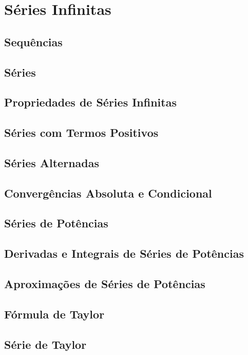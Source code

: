 \chapter{Séries Infinitas}
\label{chp:series}

\section{Sequências}
\label{sec:sequences}

\section{Séries}
\label{sec:series}

\section{Propriedades de Séries Infinitas}
\label{sec:propseries}

\section{Séries com Termos Positivos}
\label{sec:positiveseries}

\section{Séries Alternadas}
\label{sec:alternatingseries}

\section{Convergências Absoluta e Condicional}
\label{sec:convergence}

\section{Séries de Potências}
\label{sec:powerseries}

\section{Derivadas e Integrais de Séries de Potências}
\label{sec:diffseries}

\section{Aproximações de Séries de Potências}
\label{sec:powseriesapprox}

\section{Fórmula de Taylor}
\label{sec:taylorformula}

\section{Série de Taylor}
\label{sec:taylorseries}

\begin{chapterproblems}
\end{chapterproblems}


